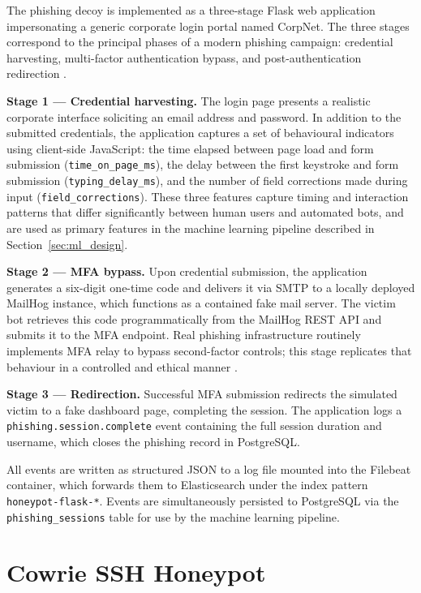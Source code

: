 The phishing decoy is implemented as a three-stage Flask web application
impersonating a generic corporate login portal named CorpNet. The three stages
correspond to the principal phases of a modern phishing campaign: credential
harvesting, multi-factor authentication bypass, and post-authentication
redirection \cite{Leita2008Phishing}.

\textbf{Stage 1 — Credential harvesting.} The login page presents a realistic
corporate interface soliciting an email address and password. In addition to
the submitted credentials, the application captures a set of behavioural
indicators using client-side JavaScript: the time elapsed between page load and
form submission (\texttt{time\_on\_page\_ms}), the delay between the first
keystroke and form submission (\texttt{typing\_delay\_ms}), and the number of
field corrections made during input (\texttt{field\_corrections}). These three
features capture timing and interaction patterns that differ significantly
between human users and automated bots, and are used as primary features in the
machine learning pipeline described in Section~\ref{sec:ml_design}.

\textbf{Stage 2 — MFA bypass.} Upon credential submission, the application
generates a six-digit one-time code and delivers it via SMTP to a locally
deployed MailHog instance, which functions as a contained fake mail server. The
victim bot retrieves this code programmatically from the MailHog REST API and
submits it to the MFA endpoint. Real phishing infrastructure routinely
implements MFA relay to bypass second-factor controls; this stage replicates
that behaviour in a controlled and ethical manner \cite{Moric2025Honeypots}.

\textbf{Stage 3 — Redirection.} Successful MFA submission redirects the
simulated victim to a fake dashboard page, completing the session. The
application logs a \texttt{phishing.session.complete} event containing the full
session duration and username, which closes the phishing record in PostgreSQL.

All events are written as structured JSON to a log file mounted into the
Filebeat container, which forwards them to Elasticsearch under the index pattern
\texttt{honeypot-flask-*}. Events are simultaneously persisted to PostgreSQL
via the \texttt{phishing\_sessions} table for use by the machine learning
pipeline.

\section{Cowrie SSH Honeypot}
\label{sec:cowrie}

